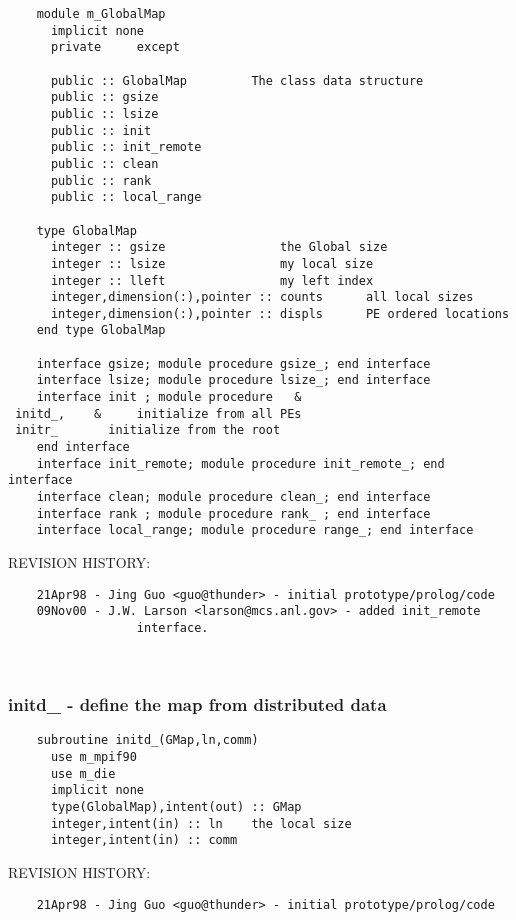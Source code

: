 \begin{verbatim} 
    module m_GlobalMap
      implicit none
      private	  except
 
      public :: GlobalMap		  The class data structure
      public :: gsize
      public :: lsize
      public :: init
      public :: init_remote
      public :: clean
      public :: rank
      public :: local_range
 
    type GlobalMap
      integer :: gsize				  the Global size
      integer :: lsize				  my local size
      integer :: lleft				  my left index
      integer,dimension(:),pointer :: counts	  all local sizes
      integer,dimension(:),pointer :: displs	  PE ordered locations
    end type GlobalMap
 
    interface gsize; module procedure gsize_; end interface
    interface lsize; module procedure lsize_; end interface
    interface init ; module procedure	&
 initd_,	&	  initialize from all PEs
 initr_		  initialize from the root
    end interface
    interface init_remote; module procedure init_remote_; end interface
    interface clean; module procedure clean_; end interface
    interface rank ; module procedure rank_ ; end interface
    interface local_range; module procedure range_; end interface
 \end{verbatim}{\sf REVISION HISTORY:}
\begin{verbatim}  	21Apr98 - Jing Guo <guo@thunder> - initial prototype/prolog/code
  	09Nov00 - J.W. Larson <larson@mcs.anl.gov> - added init_remote
                  interface.\end{verbatim}
 
 
\mbox{}\hrulefill\ 
 

 \subsubsection{initd\_ - define the map from distributed data}


 
 
\begin{verbatim} 
    subroutine initd_(GMap,ln,comm)
      use m_mpif90
      use m_die
      implicit none
      type(GlobalMap),intent(out) :: GMap
      integer,intent(in) :: ln	  the local size
      integer,intent(in) :: comm
 \end{verbatim}{\sf REVISION HISTORY:}
\begin{verbatim}  	21Apr98 - Jing Guo <guo@thunder> - initial prototype/prolog/code\end{verbatim}
 
